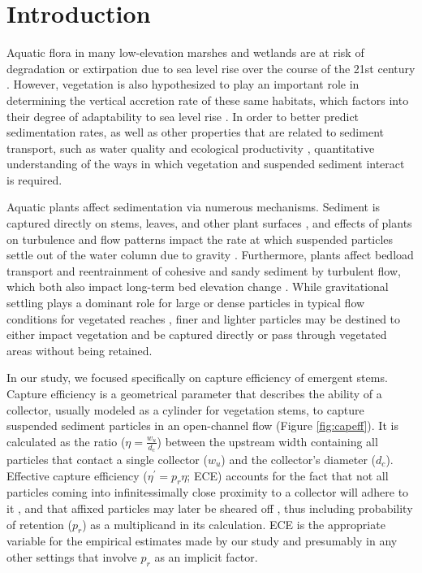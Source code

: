 \documentclass[geosciences,article,submit,moreauthors,pdftex]{Definitions/mdpi}
\begin{document}
\section{Introduction}

Aquatic flora in many low-elevation marshes and wetlands are at risk of degradation or extirpation due to sea level rise over the course of the 21st century \cite{thorne2018us,jankowski2017vulnerability}. However, vegetation is also hypothesized to play an important role in determining the vertical accretion rate of these same habitats, which factors into their degree of adaptability to sea level rise \cite{kirwan2010limits}. In order to better predict sedimentation rates, as well as other properties that are related to sediment transport, such as water quality \cite{goodwin2003temporal} and ecological productivity \cite{kirwan2007coupled}, quantitative understanding of the ways in which vegetation and suspended sediment interact is required.

Aquatic plants affect sedimentation via numerous mechanisms. Sediment is captured directly on stems, leaves, and other plant surfaces \cite{mudd2010does, peruzzo2012capillary}, and effects of plants on turbulence and flow patterns impact the rate at which suspended particles settle out of the water column due to gravity \cite{christiansen2000flow, leonard1995flow, Nielsen_1993, Jacobs_2016, Wang_2018}. Furthermore, plants affect bedload transport \cite{yager2013influence, yang2019impact, jordanova2003experimental} and reentrainment of cohesive \cite{d2007landscape} and sandy \cite{tinoco2018turbulence} sediment by turbulent flow, which both also impact long-term bed elevation change \cite{wu2005depth,d2007landscape}. While gravitational settling plays a dominant role for large or dense particles in typical flow conditions for vegetated reaches \cite{mudd2010does, leonard1995flow}, finer and lighter particles may be destined to either impact vegetation and be captured directly or pass through vegetated areas without being retained.

In our study, we focused specifically on capture efficiency of emergent stems. Capture efficiency is a geometrical parameter that describes the ability of a collector, usually modeled as a cylinder for vegetation stems, to capture suspended sediment particles in an open-channel flow (Figure \ref{fig:capeff}). It is calculated as the ratio ($\eta=\frac{w_u}{d_c}$) between the upstream width containing all particles that contact a single collector ($w_u$) and the collector's diameter ($d_c$). Effective capture efficiency ($\eta^\prime=p_r\eta$; ECE) accounts for the fact that not all particles coming into infinitessimally close proximity to a collector will adhere to it \cite{spielman1977particle}, and that affixed particles may later be sheared off \cite{defina2010floating}, thus including probability of retention ($p_r$) as a multiplicand in its calculation. ECE is the appropriate variable for the empirical estimates made by our study and presumably in any other settings that involve $p_r$ as an implicit factor.
\end{document}
